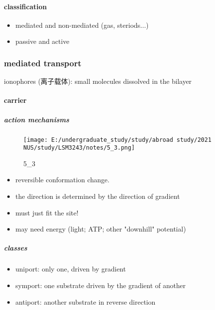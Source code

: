 \documentclass[]{article}
\let\oldparagraph\paragraph
\renewcommand{\paragraph}[1]{\oldparagraph{#1}\mbox{}}
\let\oldsubparagraph\subparagraph
\renewcommand{\subparagraph}[1]{\oldsubparagraph{#1}\mbox{}}
\begin{document}
\hypertarget{classification}{%
\paragraph{classification}\label{classification}}

\begin{itemize}
\item
  mediated and non-mediated (gas, steriods...)
\item
  passive and active
\end{itemize}

\hypertarget{mediated-transport}{%
\subsubsection{mediated transport }\label{mediated-transport}}

ionophores (离子载体): small molecules dissolved in the bilayer

\hypertarget{carrier}{%
\paragraph{carrier}\label{carrier}}

\hypertarget{action-mechanisms}{%
\subparagraph{action mechanisms}\label{action-mechanisms}}

\begin{figure}
\centering
\texttt{[image: E:/undergraduate\_study/study/abroad study/2021 NUS/study/LSM3243/notes/5\_3.png]}
\caption{5\_3}
\end{figure}

\begin{itemize}
\item
  reversible conformation change. 
\item
  the direction is determined by the direction of gradient
\item
  must just fit the site! 
\item
  may need energy (light; ATP; other "downhill" potential)
\end{itemize}

\hypertarget{classes}{%
\subparagraph{classes}\label{classes}}

\begin{itemize}
\item
  uniport: only one, driven by gradient
\item
  symport: one substrate driven by the gradient of another
\item
  antiport: another substrate in reverse direction
\end{itemize}
\end{document}
